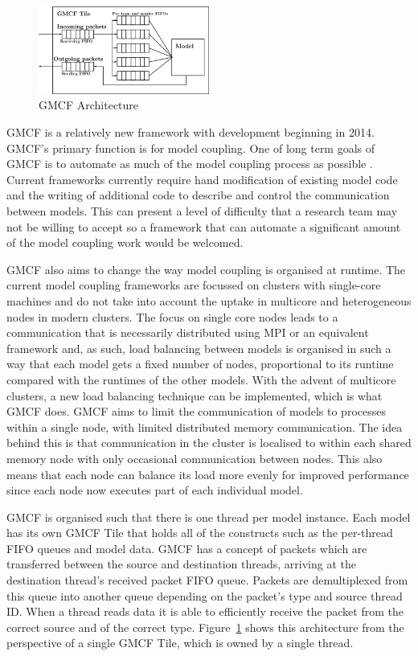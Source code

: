 \begin{figure}
    \includegraphics[width=0.5\textwidth]{graphs/gmcfArchitecture.png}
    \caption{GMCF Architecture}
    \label{fig:gmcfArchitecture}
\end{figure}

GMCF is a relatively new framework with development beginning in 2014. GMCF's
primary function is for model coupling. One of long term goals of GMCF is to
automate as much of the model coupling process as possible
\cite{Vanderbauwhede2015}. Current frameworks currently require hand
modification of existing model code and the writing of additional code to
describe and control the communication between models. This can present a level
of difficulty that a research team may not be willing to accept so a framework
that can automate a significant amount of the model coupling work would be
welcomed.

GMCF also aims to change the way model coupling is organised at runtime. The
current model coupling frameworks are focussed on clusters with single-core
machines and do not take into account the uptake in multicore and heterogeneous
nodes in modern clusters. The focus on single core nodes leads to a
communication that is necessarily distributed using MPI or an equivalent
framework and, as such, load balancing between models is organised in such a way
that each model gets a fixed number of nodes, proportional to its runtime
compared with the runtimes of the other models. With the advent of multicore
clusters, a new load balancing technique can be implemented, which is what GMCF
does. GMCF aims to limit the communication of models to processes within a
single node, with limited distributed memory communication. The idea behind this
is that communication in the cluster is localised to within each shared memory
node with only occasional communication between nodes. This also means that each
node can balance its load more evenly for improved performance since each node
now executes part of each individual model.

GMCF is organised such that there is one thread per model instance. Each model
has its own GMCF Tile that holds all of the constructs such as the per-thread
FIFO queues and model data. GMCF has a concept of packets which are transferred
between the source and destination threads, arriving at the destination thread's
received packet FIFO queue. Packets are demultiplexed from this queue into
another queue depending on the packet's type and source thread ID. When a thread
reads data it is able to efficiently receive the packet from the correct source
and of the correct type. Figure~\ref{fig:gmcfArchitecture} shows this
architecture from the perspective of a single GMCF Tile, which is owned by a
single thread.

